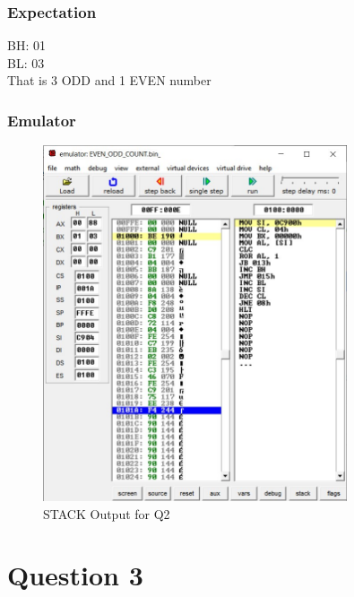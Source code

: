 \documentclass{article}
\begin{document}
\subsubsection{Expectation}
BH: 01 \\
BL: 03 \\
That is 3 ODD and 1 EVEN number \\

\break
\subsubsection{Emulator}
\begin{figure}[h]
\begin{center}
\includegraphics[width=0.8\textwidth]{EVEN_ODD_COUNT} 
\caption{STACK Output for Q2}
\end{center}
\end{figure}



\break
\section{Question 3}
\end{document}
